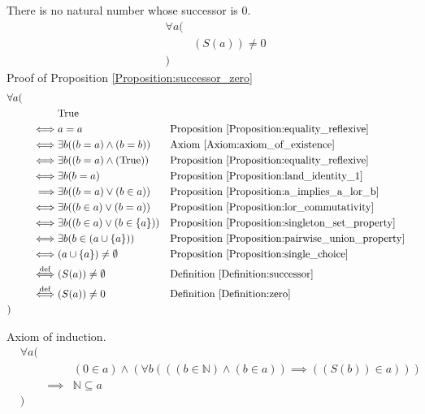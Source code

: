 \begin{prop}
\label{Proposition:successor_zero}
There is no natural number whose successor is 0.
\begin{align*}
& \forall a ( \\
& & (S(a)) \neq 0 \\
& )
\end{align*}
Proof of Proposition \ref{Proposition:successor_zero}
\begin{align*}
& \forall a ( \\
& & & \text{True} \\
& & \iff & a = a
& & \text{Proposition \ref{Proposition:equality_reflexive}} \\
& & \iff & \exists b ((b = a) \land (b = b))
& & \text{Axiom \ref{Axiom:axiom_of_existence}} \\
& & \iff & \exists b ((b = a) \land (\text{True}))
& & \text{Proposition \ref{Proposition:equality_reflexive}} \\
& & \iff & \exists b (b = a)
& & \text{Proposition \ref{Proposition:land_identity_1}} \\
& & \implies & \exists b ((b = a) \lor (b \in a))
& & \text{Proposition \ref{Proposition:a_implies_a_lor_b}} \\
& & \iff & \exists b ((b \in a) \lor (b = a))
& & \text{Proposition \ref{Proposition:lor_commutativity}} \\
& & \iff & \exists b ((b \in a) \lor (b \in \{ a \}))
& & \text{Proposition \ref{Proposition:singleton_set_property}} \\
& & \iff & \exists b (b \in (a \cup \{ a \}))
& & \text{Proposition \ref{Proposition:pairwise_union_property}} \\
& & \iff & (a \cup \{ a \}) \neq \emptyset
& & \text{Proposition \ref{Proposition:single_choice}} \\
& & \overset{\operatorname{def}}{\iff} & (S(a)) \neq \emptyset
& & \text{Definition \ref{Definition:successor}} \\
& & \overset{\operatorname{def}}{\iff} & (S(a)) \neq 0
& & \text{Definition \ref{Definition:zero}} \\
& )
\end{align*}
\end{prop}

\begin{axm}
\label{Axiom:induction}
Axiom of induction.
\begin{align*}
& \forall a ( \\
& & & (0 \in a) \land (\forall b (((b \in \mathbb{N}) \land (b \in a)) \implies ((S(b)) \in a))) \\
& & \implies & \mathbb{N} \subseteq a \\
& )
\end{align*}
\end{axm}


